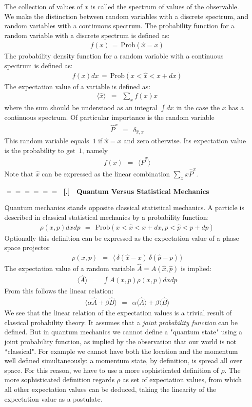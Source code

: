 \documentclass[onecolumn,fleqn]{revtex4}
\newcommand{\beq}{\begin{eqnarray}}
\newcommand{\eeq}{\end{eqnarray}}
\renewcommand{\thesubsection}{\arabic{subsection}}
\renewcommand{\thesubsubsection}{\arabic{subsubsection}}
\newcommand{\sheadC}[1]
{
\addtocounter{subsubsection}{1}
\vspace{5mm}
{\Large\bf $=\!=\!=\!=\!=\!=\;$ [\thesubsection.\thesubsubsection] \ #1}  
\nopagebreak
\phantomsection
}
\begin{document}
The collection of values of ${x}$ is called the spectrum 
of values of the observable. We make the distinction 
between random variables with a discrete spectrum, 
and random variables with a continuous spectrum. 
The probability function for a random variable 
with a discrete spectrum is defined as:
\beq
f (x) \,=\, \mbox{Prob}( \hat{x} =x ) 
\eeq
The probability density function for a random 
variable with a continuous spectrum is defined as:
\beq
f(x)dx \, = \, \mbox{Prob}( x < \hat{x}< x+dx ) 
\eeq
The expectation value of a variable is defined as:
\beq
\langle \hat{x} \rangle \,\,\,=\,\,\, 
\sum_x f(x) x  
\eeq
where the sum should be understood 
as an integral $\int dx$ in the case 
the $x$ has a continuous spectrum. 
Of particular importance is the random variable  
\beq
\hat{P}^x \ \ = \ \ \delta_{\hat{x},x}
\eeq
This random variable equals~$1$ if ${\hat{x}=x}$ 
and zero otherwise. Its expectation value is the 
probability to get~$1$, namely 
\beq
f(x) \ \ = \ \ \langle \hat{P}^x \rangle 
\eeq
Note that $\hat{x}$ can be expressed as 
the linear combination $\sum_x x \hat{P}^x$. 


\sheadC{Quantum Versus Statistical Mechanics}

Quantum mechanics stands opposite classical statistical mechanics. 
A particle is described in classical statistical mechanics by a probability function:
\beq
\rho(x,p)dxdp \ \ = \ \ \mbox{Prob}( x < \hat{x}<x+dx, p < \hat{p} < p + dp) 
\eeq
Optionally this definition can be expressed as the expectation value 
of a phase space projector 
\beq
\rho(x,p) \ \ =  \ \ \langle \,\delta(\hat{x}-x)\,\delta(\hat{p}-p) \,\rangle
\eeq
The expectation value of a random 
variable ${\hat{A} = A(\hat{x}, \hat{p})}$ 
is implied:
\beq
\langle \hat{A} \rangle \ \ = \ \ \int A(x, p) \rho(x, p) dxdp 
\eeq
From this follows the linear relation:
\beq
\langle \alpha \hat{A} + \beta \hat{B} \rangle 
\ \ = \ \ \alpha \langle \hat{A}\rangle + \beta \langle \hat{B} \rangle
\eeq
We see that the linear relation of the expectation 
values is a trivial result of classical probability 
theory. It assumes that a {\em joint probability function}  
can be defined. But in quantum mechanics we 
cannot define a "quantum state" using a joint 
probability function, as implied by the observation  
that our world is not ``classical". For example 
we cannot have both the location and the momentum 
well defined simultaneously: a momentum state, 
by definition, is spread all over space.
For this reason, we have to use a more sophisticated 
definition of ${\rho}$. The more sophisticated definition 
regards $\rho$ as set of expectation values,
from which all other expectation values can be deduced,    
taking the linearity of the expectation value as a postulate. 
\end{document}
